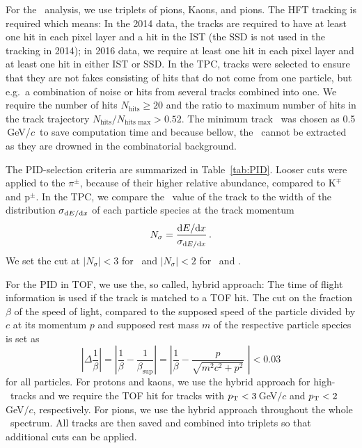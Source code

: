 For the \Lambdac\ analysis, we use triplets of pions, Kaons, and pions. The HFT tracking is required which means: In the 2014 data, the tracks are required to have at least one hit in each pixel layer and a hit in the IST (the SSD is not used in the tracking in 2014); in 2016 data, we require at least one hit in each pixel layer and at least one hit in either IST or SSD\@.  In the TPC, tracks were selected to ensure that they are not fakes consisting of hits that do not come from one particle, but e.g.\ a combination of noise or hits from several tracks combined into one. We require the number of hits $N_\mathrm{hits} \geq 20$ and the ratio to maximum number of hits in the track trajectory $N_\mathrm{hits}/N_\text{hits max} > 0.52$\@. The minimum track \pt\ was chosen as 0.5$\,$GeV/$c$\ to save computation time and because bellow, the \Lambdac\ cannot be extracted as they are drowned in the combinatorial background\@.

The PID-selection criteria are summarized in Table~\ref{tab:PID}. Looser cuts were applied to the $\pi^\pm$, because of their higher relative abundance, compared to K$^\mp$ and p$^\pm$. In the TPC, we compare the \dedx\ value of the track to the width of the distribution $\sigma_{\mathrm{d} E / \mathrm{d} x}$ of each particle species at the track momentum
\begin{equation}
N_\sigma = \frac{\mathrm{d} E / \mathrm{d} x}{\sigma_{\mathrm{d} E / \mathrm{d} x}}\,. 
\end{equation}
We set the cut at $|N_\sigma| < 3$ for \pipm\ and $|N_\sigma| < 2$ for \Kmp\ and \ppm\@. 

For the PID in TOF, we use the, so called, hybrid approach: The time of flight information is used if the track is matched to a TOF hit. The cut on the fraction $\beta$ of the speed of light, compared to the supposed speed of the particle divided by $c$ at its momentum $p$ and supposed rest mass $m$ of the respective particle species is set as
\begin{equation}
 \left|\Delta \frac{1}{\beta}\right| = \left| \frac{1}{\beta} - \frac{1}{\beta_\mathrm{sup}} \right| = \left| \frac{1}{\beta} - \frac{p}{\sqrt{m^2c^2 + p^2}} \,\,\right| < 0.03
\end{equation}
for all particles. For protons and kaons, we use the hybrid approach for high-\pt\ tracks and we require the TOF hit for tracks with ${p_{\mathrm{T}}} < 3\,$GeV$/c$ and ${p_{\mathrm{T}}} < 2\,$GeV$/c$, respectively. For pions, we use the hybrid approach throughout the whole \pt\ spectrum. All tracks are then saved and combined into triplets so that additional cuts can be applied.


